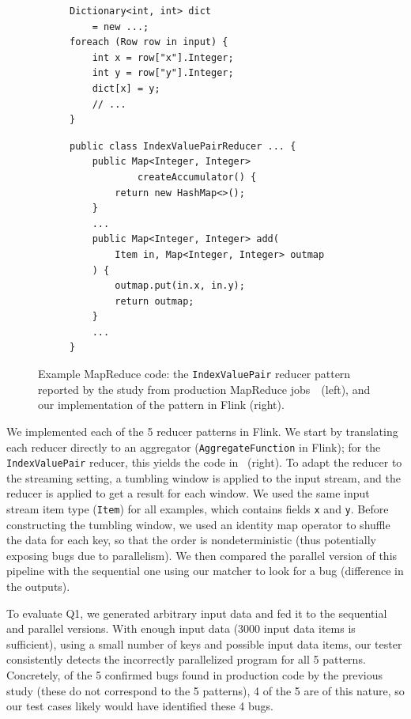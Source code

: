 \begin{figure}[tb]
    \centering \small

\begin{subfigure}[t]{0.36\textwidth}
\begin{lstlisting}
Dictionary<int, int> dict
    = new ...;
foreach (Row row in input) {
    int x = row["x"].Integer;
    int y = row["y"].Integer;
    dict[x] = y;
    // ...
}
\end{lstlisting}
\end{subfigure}
\hspace{10pt}
\begin{subfigure}[t]{0.56\textwidth}
\begin{lstlisting}
public class IndexValuePairReducer ... {
    public Map<Integer, Integer>
            createAccumulator() {
        return new HashMap<>();
    }
    ...
    public Map<Integer, Integer> add(
        Item in, Map<Integer, Integer> outmap
    ) {
        outmap.put(in.x, in.y);
        return outmap;
    }
    ...
}
\end{lstlisting}
\end{subfigure}

    \caption[Example MapReduce code.]{Example MapReduce code: the \texttt{IndexValuePair} reducer pattern reported by the study from production MapReduce jobs~\cite{xiao2014nondeterminism}~(left), and our implementation of the pattern in Flink (right).}
    \label{diffstream:fig:mapreduce-case-study-code}
\end{figure}

We implemented each of the 5 reducer patterns in Flink.
We start by translating each reducer directly to an aggregator (\texttt{AggregateFunction} in Flink); for the \texttt{IndexValuePair} reducer, this yields the code in ~(right).
To adapt the reducer to the streaming setting, a tumbling window is applied to the input stream, and the reducer is applied to get a result for each window.
We used the same input stream item type (\texttt{Item}) for all examples, which contains fields \texttt{x} and \texttt{y}.
Before constructing the tumbling window, we used an identity map operator to shuffle the data for each key, so that the order is nondeterministic (thus potentially exposing bugs due to parallelism). We then compared the parallel version of this pipeline with the sequential one using our matcher to look for a bug (difference in the outputs).

To evaluate Q1, we generated arbitrary input data and fed it to the sequential and parallel versions. With enough input data (3000 input data items is sufficient), using a small number of keys and possible input data items, our tester consistently detects the incorrectly parallelized program for all 5 patterns.
Concretely, of the 5 confirmed bugs found in production code by the previous study (these do not correspond to the 5 patterns), 4 of the 5 are of this nature, so our test cases likely would have identified these 4 bugs.

